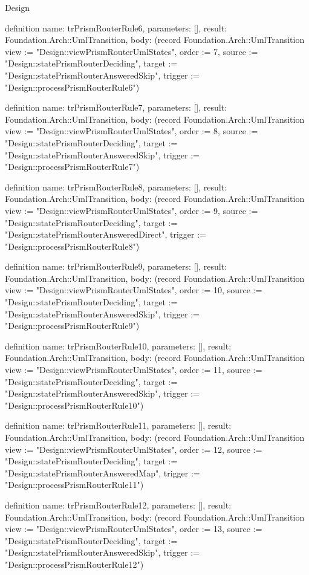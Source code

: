 \begin{lexlean}{Design}
\begin{semanticmodule}
definition{
  name: trPrismRouterRule6,
  parameters: [],
  result: Foundation.Arch::UmlTransition,
  body: (record Foundation.Arch::UmlTransition {view := "Design::viewPrismRouterUmlStates", order := 7, source := "Design::statePrismRouterDeciding", target := "Design::statePrismRouterAnsweredSkip", trigger := "Design::processPrismRouterRule6"})
}

definition{
  name: trPrismRouterRule7,
  parameters: [],
  result: Foundation.Arch::UmlTransition,
  body: (record Foundation.Arch::UmlTransition {view := "Design::viewPrismRouterUmlStates", order := 8, source := "Design::statePrismRouterDeciding", target := "Design::statePrismRouterAnsweredSkip", trigger := "Design::processPrismRouterRule7"})
}

definition{
  name: trPrismRouterRule8,
  parameters: [],
  result: Foundation.Arch::UmlTransition,
  body: (record Foundation.Arch::UmlTransition {view := "Design::viewPrismRouterUmlStates", order := 9, source := "Design::statePrismRouterDeciding", target := "Design::statePrismRouterAnsweredDirect", trigger := "Design::processPrismRouterRule8"})
}

definition{
  name: trPrismRouterRule9,
  parameters: [],
  result: Foundation.Arch::UmlTransition,
  body: (record Foundation.Arch::UmlTransition {view := "Design::viewPrismRouterUmlStates", order := 10, source := "Design::statePrismRouterDeciding", target := "Design::statePrismRouterAnsweredSkip", trigger := "Design::processPrismRouterRule9"})
}

definition{
  name: trPrismRouterRule10,
  parameters: [],
  result: Foundation.Arch::UmlTransition,
  body: (record Foundation.Arch::UmlTransition {view := "Design::viewPrismRouterUmlStates", order := 11, source := "Design::statePrismRouterDeciding", target := "Design::statePrismRouterAnsweredSkip", trigger := "Design::processPrismRouterRule10"})
}

definition{
  name: trPrismRouterRule11,
  parameters: [],
  result: Foundation.Arch::UmlTransition,
  body: (record Foundation.Arch::UmlTransition {view := "Design::viewPrismRouterUmlStates", order := 12, source := "Design::statePrismRouterDeciding", target := "Design::statePrismRouterAnsweredMap", trigger := "Design::processPrismRouterRule11"})
}

definition{
  name: trPrismRouterRule12,
  parameters: [],
  result: Foundation.Arch::UmlTransition,
  body: (record Foundation.Arch::UmlTransition {view := "Design::viewPrismRouterUmlStates", order := 13, source := "Design::statePrismRouterDeciding", target := "Design::statePrismRouterAnsweredSkip", trigger := "Design::processPrismRouterRule12"})
}


\end{semanticmodule}
\end{lexlean}
